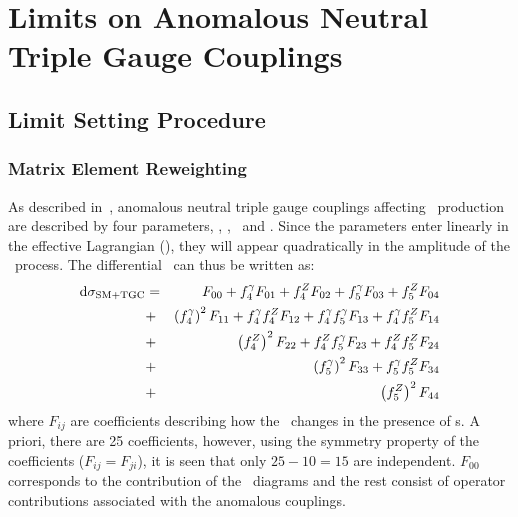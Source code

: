 \graphicspath{{Chapters/TGCLimits/Figures/}}
\chapter{Limits on Anomalous Neutral Triple Gauge Couplings}
\label{chap:TGCLimits}

\section{Limit Setting Procedure}

\subsection{Matrix Element Reweighting}
As described in~, anomalous neutral triple gauge couplings affecting \ZZ\
production are described by four parameters, \ffourg, \ffourZ, \ffiveg\ and
\ffiveZ.
Since the parameters enter linearly in the effective Lagrangian
(), they will appear
quadratically in the amplitude of the \ZZllll\ process. The differential \cx\
can thus be written as:
\begin{eqnarray}\label{eqn:dsigma}
{\rm d}\sigma_{\rm SM+TGC} & = & F_{00} + f_4^\gamma F_{01} + f_4^Z F_{02} + f_5^\gamma F_{03} + f_5^Z F_{04}  \nonumber \\
&+& \left(f_4^\gamma\right)^2F_{11} + f_4^\gamma f_4^Z F_{12} +  f_4^\gamma f_5^\gamma F_{13} + f_4^\gamma f_5^Z F_{14}  \nonumber \\
&+& \left(f_4^Z\right)^2F_{22} + f_4^Zf_5^\gamma F_{23} + f_4^Zf_5^Z F_{24}  \nonumber \\
&+& \left(f_5^\gamma\right)^2F_{33} + f_5^\gamma f_5^Z F_{34} \nonumber \\
&+& \left(f_5^Z\right)^2F_{44}
\end{eqnarray}
where $F_{ij}$ are coefficients describing how the \cx\ changes in the presence
of \TGC s. A priori, there are 25 coefficients, however, using the 
symmetry property of the coefficients ($F_{ij}=F_{ji}$), it is seen 
that only $25-10=15$ are independent. $F_{00}$ corresponds to the contribution
of the \sm\ diagrams and the rest consist of operator contributions associated with the
anomalous couplings. 

